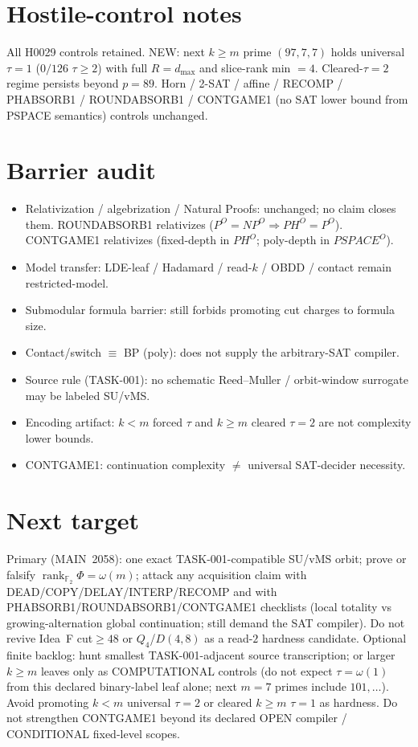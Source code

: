 \documentclass[11pt]{article}
\begin{document}
\section*{Hostile-control notes}
All H0029 controls retained. NEW: next $k{\ge}m$ prime $(97,7,7)$ holds universal
$\tau{=}1$ ($0/126$ $\tau{\ge}2$) with full $R{=}d_{\max}$ and slice-rank min $=4$.
Cleared-$\tau{=}2$ regime persists beyond $p{=}89$. Horn / 2-SAT / affine /
RECOMP / PHABSORB1 / ROUNDABSORB1 / CONTGAME1 (no SAT lower bound from PSPACE semantics)
controls unchanged.

\section*{Barrier audit}
\begin{itemize}
\item Relativization / algebrization / Natural Proofs: unchanged; no claim closes them.
  ROUNDABSORB1 relativizes ($P^O{=}NP^O\Rightarrow PH^O{=}P^O$).
  CONTGAME1 relativizes (fixed-depth in $PH^O$; poly-depth in $PSPACE^O$).
\item Model transfer: LDE-leaf / Hadamard / read-$k$ / OBDD / contact remain restricted-model.
\item Submodular formula barrier: still forbids promoting cut charges to formula size.
\item Contact/switch $\equiv$ BP (poly): does not supply the arbitrary-SAT compiler.
\item Source rule (TASK-001): no schematic Reed--Muller / orbit-window surrogate may be labeled SU/vMS.
\item Encoding artifact: $k{<}m$ forced $\tau$ and $k{\ge}m$ cleared $\tau{=}2$ are not complexity lower bounds.
\item CONTGAME1: continuation complexity $\neq$ universal SAT-decider necessity.
\end{itemize}

\section*{Next target}
Primary (MAIN~2058): one exact TASK-001-compatible SU/vMS orbit; prove or falsify
$\operatorname{rank}_{\mathbb F_2}\Phi=\omega(m)$; attack any acquisition claim with
DEAD/COPY/DELAY/INTERP/RECOMP and with PHABSORB1/ROUNDABSORB1/CONTGAME1 checklists
(local totality vs growing-alternation global continuation; still demand the SAT compiler).
Do not revive Idea~F cut$\ge48$ or $Q_4$/$D(4,8)$ as a read-$2$ hardness candidate.
Optional finite backlog: hunt smallest TASK-001-adjacent source transcription;
or larger $k{\ge}m$ leaves only as COMPUTATIONAL controls (do not expect $\tau=\omega(1)$
from this declared binary-label leaf alone; next $m{=}7$ primes include $101,\ldots$).
Avoid promoting $k{<}m$ universal $\tau{=}2$ or cleared $k{\ge}m$ $\tau{=}1$ as hardness.
Do not strengthen CONTGAME1 beyond its declared OPEN compiler / CONDITIONAL fixed-level scopes.
\end{document}
